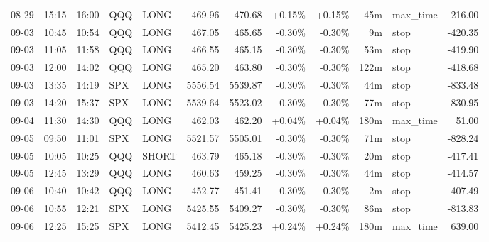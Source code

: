 \documentclass[11pt,a4paper,twoside]{article}
\begin{document}
\begin{center}
\begin{longtable}{>{\color{txtmain}}l l l l l r r r r r >{\color{txtmain}}l r}
08-29 & 15:15 & 16:00 & QQQ & LONG & 469.96 & 470.68 & \textcolor{wingreen}{+0.15\%} & \textcolor{wingreen}{+0.15\%} & 45m & max\_time & \textcolor{wingreen}{216.00} \\
09-03 & 10:45 & 10:54 & QQQ & LONG & 467.05 & 465.65 & \textcolor{lossred}{-0.30\%} & \textcolor{lossred}{-0.30\%} & 9m & stop & \textcolor{lossred}{-420.35} \\
09-03 & 11:05 & 11:58 & QQQ & LONG & 466.55 & 465.15 & \textcolor{lossred}{-0.30\%} & \textcolor{lossred}{-0.30\%} & 53m & stop & \textcolor{lossred}{-419.90} \\
09-03 & 12:00 & 14:02 & QQQ & LONG & 465.20 & 463.80 & \textcolor{lossred}{-0.30\%} & \textcolor{lossred}{-0.30\%} & 122m & stop & \textcolor{lossred}{-418.68} \\
09-03 & 13:35 & 14:19 & SPX & LONG & 5556.54 & 5539.87 & \textcolor{lossred}{-0.30\%} & \textcolor{lossred}{-0.30\%} & 44m & stop & \textcolor{lossred}{-833.48} \\
09-03 & 14:20 & 15:37 & SPX & LONG & 5539.64 & 5523.02 & \textcolor{lossred}{-0.30\%} & \textcolor{lossred}{-0.30\%} & 77m & stop & \textcolor{lossred}{-830.95} \\
09-04 & 11:30 & 14:30 & QQQ & LONG & 462.03 & 462.20 & \textcolor{wingreen}{+0.04\%} & \textcolor{wingreen}{+0.04\%} & 180m & max\_time & \textcolor{wingreen}{51.00} \\
09-05 & 09:50 & 11:01 & SPX & LONG & 5521.57 & 5505.01 & \textcolor{lossred}{-0.30\%} & \textcolor{lossred}{-0.30\%} & 71m & stop & \textcolor{lossred}{-828.24} \\
09-05 & 10:05 & 10:25 & QQQ & SHORT & 463.79 & 465.18 & \textcolor{lossred}{-0.30\%} & \textcolor{lossred}{-0.30\%} & 20m & stop & \textcolor{lossred}{-417.41} \\
09-05 & 12:45 & 13:29 & QQQ & LONG & 460.63 & 459.25 & \textcolor{lossred}{-0.30\%} & \textcolor{lossred}{-0.30\%} & 44m & stop & \textcolor{lossred}{-414.57} \\
09-06 & 10:40 & 10:42 & QQQ & LONG & 452.77 & 451.41 & \textcolor{lossred}{-0.30\%} & \textcolor{lossred}{-0.30\%} & 2m & stop & \textcolor{lossred}{-407.49} \\
09-06 & 10:55 & 12:21 & SPX & LONG & 5425.55 & 5409.27 & \textcolor{lossred}{-0.30\%} & \textcolor{lossred}{-0.30\%} & 86m & stop & \textcolor{lossred}{-813.83} \\
09-06 & 12:25 & 15:25 & SPX & LONG & 5412.45 & 5425.23 & \textcolor{wingreen}{+0.24\%} & \textcolor{wingreen}{+0.24\%} & 180m & max\_time & \textcolor{wingreen}{639.00} \\

\end{longtable}
\end{center}
\end{document}

